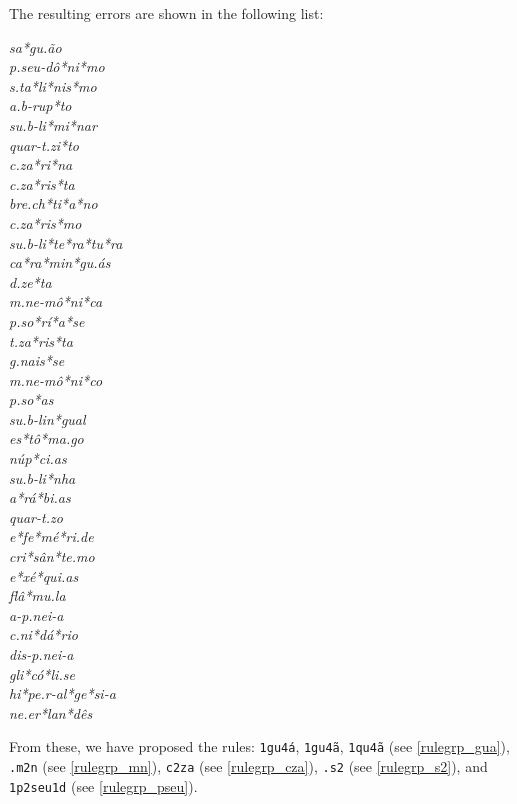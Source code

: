 The resulting errors are shown in the following list:
\begin{multicols}{5}
\setlength{\columnsep}{0pt}
\setlength{\parindent}{0pt}
\emph{sa*gu.ão \\ p.seu-dô*ni*mo \\ s.ta*li*nis*mo \\ a.b-rup*to \\ su.b-li*mi*nar \\ quar-t.zi*to \\ c.za*ri*na \\ c.za*ris*ta \\ bre.ch*ti*a*no \\ c.za*ris*mo \\ su.b-li*te*ra*tu*ra \\ ca*ra*min*gu.ás \\ d.ze*ta \\ m.ne-mô*ni*ca \\ p.so*rí*a*se \\ t.za*ris*ta \\ g.nais*se \\ m.ne-mô*ni*co \\ p.so*as \\ su.b-lin*gual \\ es*tô*ma.go \\ núp*ci.as \\ su.b-li*nha \\ a*rá*bi.as \\ quar-t.zo \\ e*fe*mé*ri.de \\ cri*sân*te.mo \\ e*xé*qui.as \\ flâ*mu.la \\ a-p.nei-a \\ c.ni*dá*rio \\ dis-p.nei-a \\ gli*có*li.se \\ hi*pe.r-al*ge*si-a \\ ne.er*lan*dês}
\end{multicols}
\noindent{}From these, we have proposed the rules: \texttt{1gu4á}, \texttt{1gu4ã}, \texttt{1qu4ã} (see \cref{rulegrp_gua}),
\texttt{.m2n} (see \cref{rulegrp_mn}), \texttt{c2za} (see \cref{rulegrp_cza}), \texttt{.s2} (see \cref{rulegrp_s2}), and \texttt{1p2seu1d} (see \cref{rulegrp_pseu}).

